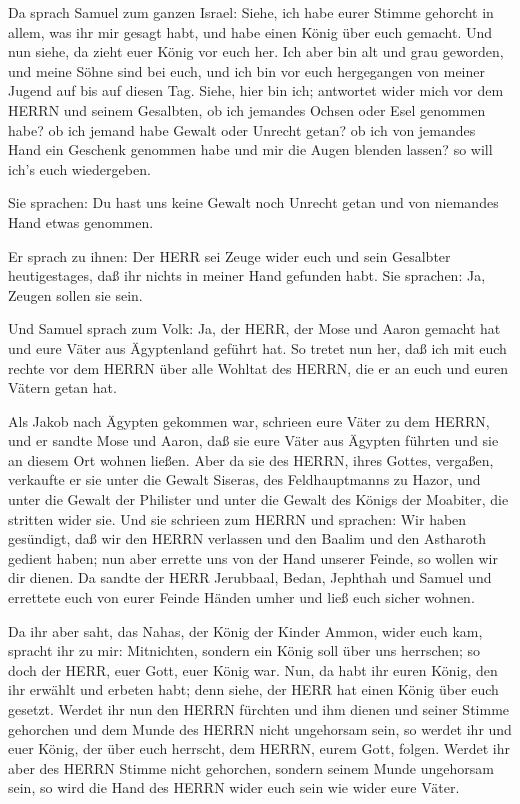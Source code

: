  Da sprach Samuel zum ganzen Israel: Siehe, ich habe eurer
Stimme gehorcht in allem, was ihr mir gesagt habt, und habe einen König
über euch gemacht.  Und nun siehe, da zieht euer König vor
euch her. Ich aber bin alt und grau geworden, und meine Söhne sind bei
euch, und ich bin vor euch hergegangen von meiner Jugend auf bis auf
diesen Tag.  Siehe, hier bin ich; antwortet wider mich vor
dem HERRN und seinem Gesalbten, ob ich jemandes Ochsen oder Esel
genommen habe? ob ich jemand habe Gewalt oder Unrecht getan? ob ich von
jemandes Hand ein Geschenk genommen habe und mir die Augen blenden
lassen? so will ich's euch wiedergeben.

 Sie sprachen: Du hast uns keine Gewalt noch Unrecht getan
und von niemandes Hand etwas genommen.

 Er sprach zu ihnen: Der HERR sei Zeuge wider euch und sein
Gesalbter heutigestages, daß ihr nichts in meiner Hand gefunden habt.
Sie sprachen: Ja, Zeugen sollen sie sein.

 Und Samuel sprach zum Volk: Ja, der HERR, der Mose und
Aaron gemacht hat und eure Väter aus Ägyptenland geführt hat.
 So tretet nun her, daß ich mit euch rechte vor dem HERRN
über alle Wohltat des HERRN, die er an euch und euren Vätern getan hat.

 Als Jakob nach Ägypten gekommen war, schrieen eure Väter zu
dem HERRN, und er sandte Mose und Aaron, daß sie eure Väter aus Ägypten
führten und sie an diesem Ort wohnen ließen.  Aber da sie
des HERRN, ihres Gottes, vergaßen, verkaufte er sie unter die Gewalt
Siseras, des Feldhauptmanns zu Hazor, und unter die Gewalt der Philister
und unter die Gewalt des Königs der Moabiter, die stritten wider sie.
 Und sie schrieen zum HERRN und sprachen: Wir haben
gesündigt, daß wir den HERRN verlassen und den Baalim und den Astharoth
gedient haben; nun aber errette uns von der Hand unserer Feinde, so
wollen wir dir dienen.  Da sandte der HERR Jerubbaal,
Bedan, Jephthah und Samuel und errettete euch von eurer Feinde Händen
umher und ließ euch sicher wohnen.

 Da ihr aber saht, das Nahas, der König der Kinder Ammon,
wider euch kam, spracht ihr zu mir: Mitnichten, sondern ein König soll
über uns herrschen; so doch der HERR, euer Gott, euer König war.
 Nun, da habt ihr euren König, den ihr erwählt und erbeten
habt; denn siehe, der HERR hat einen König über euch gesetzt.
 Werdet ihr nun den HERRN fürchten und ihm dienen und
seiner Stimme gehorchen und dem Munde des HERRN nicht ungehorsam sein,
so werdet ihr und euer König, der über euch herrscht, dem HERRN, eurem
Gott, folgen.  Werdet ihr aber des HERRN Stimme nicht
gehorchen, sondern seinem Munde ungehorsam sein, so wird die Hand des
HERRN wider euch sein wie wider eure Väter.


